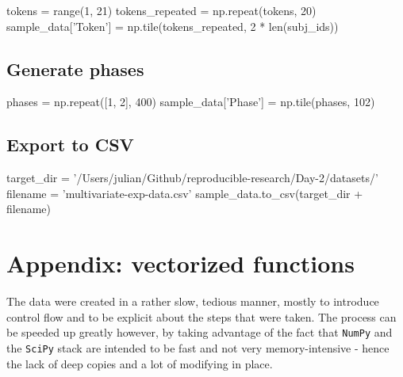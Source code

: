 \documentclass[]{article}
\newenvironment{Shaded}{\begin{snugshade}}{\end{snugshade}}
\newcommand{\DataTypeTok}[1]{\textcolor[rgb]{0.13,0.29,0.53}{{#1}}}
\newcommand{\DecValTok}[1]{\textcolor[rgb]{0.00,0.00,0.81}{{#1}}}
\newcommand{\StringTok}[1]{\textcolor[rgb]{0.31,0.60,0.02}{{#1}}}
\newcommand{\NormalTok}[1]{{#1}}
\begin{document}
\begin{Shaded}
\begin{Highlighting}[]
\NormalTok{tokens = }\DataTypeTok{range}\NormalTok{(}\DecValTok{1}\NormalTok{, }\DecValTok{21}\NormalTok{)}
\NormalTok{tokens_repeated = np.repeat(tokens, }\DecValTok{20}\NormalTok{)}
\NormalTok{sample_data[}\StringTok{'Token'}\NormalTok{] = np.tile(tokens_repeated, }\DecValTok{2} \NormalTok{* }\DataTypeTok{len}\NormalTok{(subj_ids))}
\end{Highlighting}
\end{Shaded}

\subsection{Generate phases}\label{generate-phases}

\begin{Shaded}
\begin{Highlighting}[]
\NormalTok{phases = np.repeat([}\DecValTok{1}\NormalTok{, }\DecValTok{2}\NormalTok{], }\DecValTok{400}\NormalTok{)}
\NormalTok{sample_data[}\StringTok{'Phase'}\NormalTok{] = np.tile(phases, }\DecValTok{102}\NormalTok{)}
\end{Highlighting}
\end{Shaded}

\subsection{Export to CSV}\label{export-to-csv}

\begin{Shaded}
\begin{Highlighting}[]
\NormalTok{target_dir = }\StringTok{'/Users/julian/Github/reproducible-research/Day-2/datasets/'}
\NormalTok{filename = }\StringTok{'multivariate-exp-data.csv'}
\NormalTok{sample_data.to_csv(target_dir + filename)}
\end{Highlighting}
\end{Shaded}

\section{Appendix: vectorized
functions}\label{appendix-vectorized-functions}

The data were created in a rather slow, tedious manner, mostly to
introduce control flow and to be explicit about the steps that were
taken. The process can be speeded up greatly however, by taking
advantage of the fact that \texttt{NumPy} and the \texttt{SciPy} stack
are intended to be fast and not very memory-intensive - hence the lack
of deep copies and a lot of modifying in place.
\end{document}
